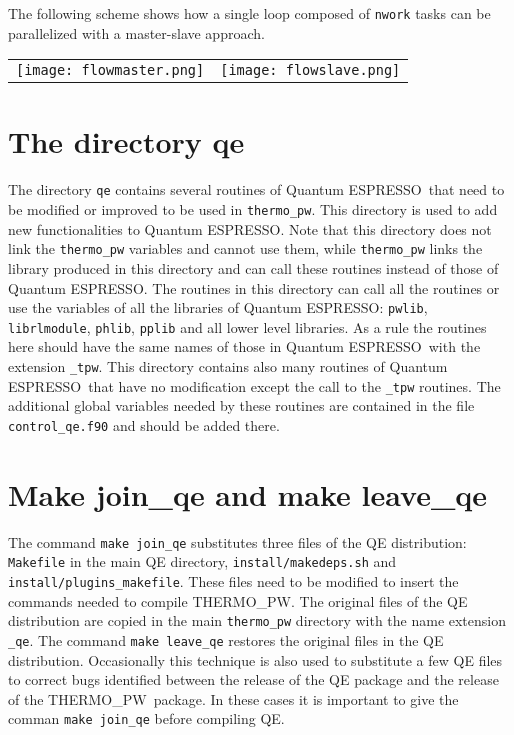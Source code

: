 \documentclass[12pt,a4paper]{article}
\def\qe{{\sc Quantum ESPRESSO}}
\def\tpw{{\sc THERMO\_PW}}
\begin{document}
The following scheme shows how a single loop composed of \texttt{nwork} tasks
can be parallelized with a master-slave approach.

\begin{figure*}[ht]
  \begin{tabular}[t]{ll}
    \texttt{[image: flowmaster.png]}
    &\texttt{[image: flowslave.png]}\\
  \end{tabular}
 \caption{Comparison between the work-flow of the master image (left)
 and of the slave images (right) in \texttt{thermo\_pw}. In the right
part of the figure we show also the equivalent serial code. The green lines
indicate the points of communication between the master and the slave images.
}
\label{figflow}
\end{figure*}

\newpage
\section{\color{coral}The directory qe}

The directory \texttt{qe} contains several routines of \qe\ that need to
be modified or improved to be used in \texttt{thermo\_pw}. This
directory is used to add new functionalities to \qe. Note that this directory
does not link the \texttt{thermo\_pw} variables and cannot use them, while
\texttt{thermo\_pw} links the library produced in this directory and can
call these routines instead of those of \qe. The routines in this directory
can call all the routines or use the variables of all the libraries
of \qe: \texttt{pwlib}, \texttt{librlmodule},
\texttt{phlib}, \texttt{pplib} and all lower level libraries.
As a rule the routines here should have the same names of those in \qe\ with
the extension \texttt{\_tpw}. This directory contains also many routines
of \qe\ that have no modification except the call to the \texttt{\_tpw}
routines. The additional global variables needed by these routines are
contained in the file \texttt{control\_qe.f90} and should be added there.

\newpage
\section{\color{coral}Make join\_qe and make leave\_qe}
The command \texttt{make join\_qe} substitutes three files of the QE
distribution: \texttt{Makefile} in the main QE directory, 
\texttt{install/makedeps.sh} and \texttt{install/plugins\_makefile}.
These files need to be modified to insert the commands needed to
compile \tpw. The original files of the QE distribution are copied
in the main \texttt{thermo\_pw} directory with the name extension
\texttt{\_qe}. The command \texttt{make leave\_qe} restores the original
files in the QE distribution.
Occasionally this technique is also used to substitute a few QE files
to correct bugs identified between the release of the QE package 
and the release of the \tpw\ package. In these cases it is important
to give the comman \texttt{make join\_qe} before compiling QE.
\end{document}
